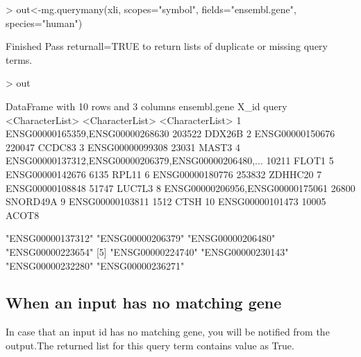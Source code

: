 \documentclass[12pt]{article}
\begin{document}
\begin{Schunk}
\begin{Sinput}
> out<-mg.querymany(xli, scopes="symbol", fields="ensembl.gene", species="human")
\end{Sinput}
\begin{Soutput}
Finished
Pass returnall=TRUE to return lists of duplicate or missing query terms.
\end{Soutput}
\begin{Sinput}
> out
\end{Sinput}
\begin{Soutput}
DataFrame with 10 rows and 3 columns
                                          ensembl.gene            X_id           query
                                       <CharacterList> <CharacterList> <CharacterList>
1                      ENSG00000165359,ENSG00000268630          203522          DDX26B
2                                      ENSG00000150676          220047          CCDC83
3                                      ENSG00000099308           23031           MAST3
4  ENSG00000137312,ENSG00000206379,ENSG00000206480,...           10211           FLOT1
5                                      ENSG00000142676            6135           RPL11
6                                      ENSG00000180776          253832         ZDHHC20
7                                      ENSG00000108848           51747          LUC7L3
8                      ENSG00000206956,ENSG00000175061           26800        SNORD49A
9                                      ENSG00000103811            1512            CTSH
10                                     ENSG00000101473           10005           ACOT8
\end{Soutput}
\begin{Soutput}
[1] "ENSG00000137312" "ENSG00000206379" "ENSG00000206480" "ENSG00000223654"
[5] "ENSG00000224740" "ENSG00000230143" "ENSG00000232280" "ENSG00000236271"
\end{Soutput}
\end{Schunk}


\subsection{When an input has no matching gene}

In case that an input id has no matching gene, you will be notified from the output.The returned list for this query term contains  value as True.
\end{document}
